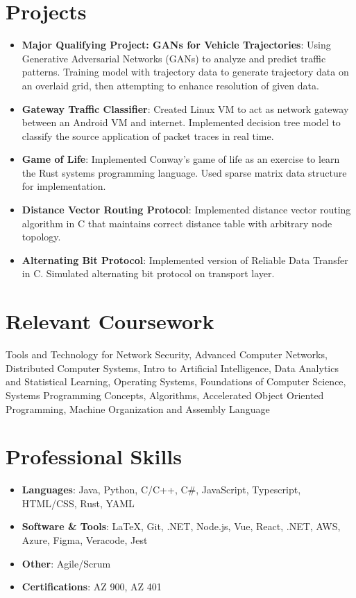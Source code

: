 \documentclass[letterpaper,11pt]{article}
\newcommand{\resumeItem}[2]{
  \item\small{
    \textbf{#1}{: #2 \vspace{-2pt}}
  }
}
\newcommand{\resumeSubItem}[2]{\resumeItem{#1}{#2}\vspace{-4pt}}
\newcommand{\resumeSubHeadingListStart}{\begin{itemize}[leftmargin=*]}
\newcommand{\resumeSubHeadingListEnd}{\end{itemize}}
\begin{document}
\section{Projects}
  \resumeSubHeadingListStart
  \resumeSubItem{Major Qualifying Project: GANs for Vehicle Trajectories}
      {Using Generative Adversarial Networks (GANs) to analyze and predict traffic patterns. Training model with trajectory data to generate trajectory data on an overlaid grid, then attempting to enhance resolution of given data.}
    \resumeSubItem{Gateway Traffic Classifier}
      {Created Linux VM to act as network gateway between an Android VM and internet. Implemented decision tree model to classify the source application of packet traces in real time.}
      \resumeSubItem{Game of Life}
      {Implemented Conway's game of life as an exercise to learn the Rust systems programming language. Used sparse matrix data structure for implementation.}
    \resumeSubItem{Distance Vector Routing Protocol}
      {Implemented distance vector routing algorithm in C that maintains correct distance table with arbitrary node topology.}
    \resumeSubItem{Alternating Bit Protocol}
      {Implemented version of Reliable Data Transfer in C. Simulated alternating bit protocol on transport layer.}
  \resumeSubHeadingListEnd
  
\section{Relevant Coursework}
  Tools and Technology for Network Security, Advanced Computer Networks, Distributed Computer Systems, Intro to Artificial Intelligence, Data Analytics and Statistical Learning, Operating Systems, Foundations of Computer Science, Systems Programming Concepts, Algorithms, Accelerated Object Oriented Programming, Machine Organization and Assembly Language

\section{Professional Skills}
 \resumeSubHeadingListStart
    \item{
     \textbf{Languages}{: Java, Python, C/C++, C\#, JavaScript, Typescript, HTML/CSS, Rust, YAML }
     }
     \item{
     \textbf{Software \& Tools}{: \LaTeX, Git, .NET, Node.js, Vue, React, .NET, AWS, Azure, Figma, Veracode, Jest}
    }
    \item{
     \textbf{Other}{: Agile/Scrum}
    }
    \item{
     \textbf{Certifications}{: AZ 900, AZ 401}
    }
 \resumeSubHeadingListEnd

\end{document}
